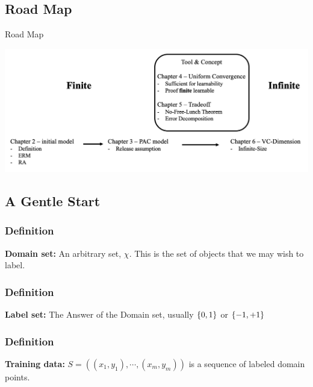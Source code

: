 



	\begin{frame}
    	\titlepage 
	\end{frame}

\begin{frame}
	\tableofcontents	
\end{frame}


\begin{frame}
	\section{Road Map}
	Road Map
	
	\begin{center}
		\includegraphics[scale = 0.25]{./figure/0-1.png}
	\end{center}
    
\end{frame}

\begin{frame}
	\section{A Gentle Start}
	\frametitle{Definition}
	\textbf{Domain set:} An arbitrary set, $\chi$. This is the set of objects that we may wish to label.
\end{frame}

\begin{frame}
	\frametitle{Definition}
	\textbf{Label set:} The Answer of the Domain set, usually $\left\{0,1 \right\}$ or $\left\{-1,+1 \right\}$
\end{frame}

\begin{frame}
	\frametitle{Definition}
	\textbf{Training data:} $S = ((x_1,y_1),\cdots,(x_m,y_m))$ is a sequence of labeled domain points.
\end{frame}


